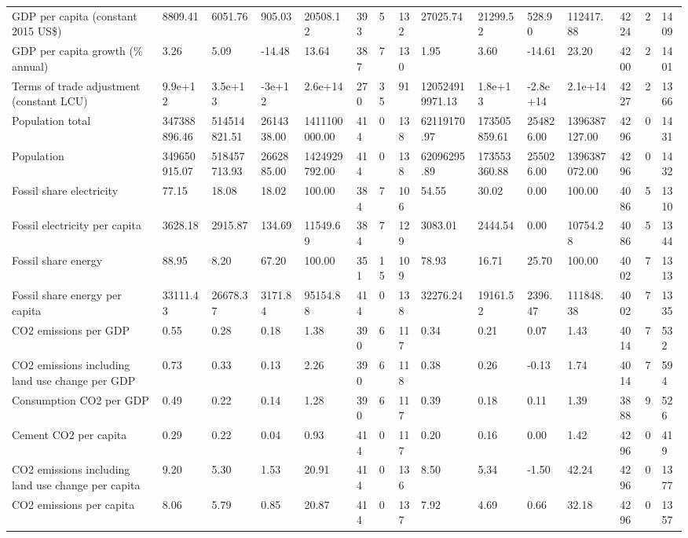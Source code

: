 \begin{longtable}{lllllllllllllll}
GDP per capita (constant 2015 US\$) & 8809.41 & 6051.76 & 905.03 & 20508.12 & 393 & 5 & 132 & 27025.74 & 21299.52 & 528.90 & 112417.88 & 4224 & 2 & 1409\\
GDP per capita growth (\% annual) & 3.26 & 5.09 & -14.48 & 13.64 & 387 & 7 & 130 & 1.95 & 3.60 & -14.61 & 23.20 & 4200 & 2 & 1401\\
\addlinespace
Terms of trade adjustment (constant LCU) & 9.9e+12 & 3.5e+13 & -3e+12 & 2.6e+14 & 270 & 35 & 91 & 120524919971.13 & 1.8e+13 & -2.8e+14 & 2.1e+14 & 4227 & 2 & 1366\\
Population total & 347388896.46 & 514514821.51 & 2614338.00 & 1411100000.00 & 414 & 0 & 138 & 62119170.97 & 173505859.61 & 254826.00 & 1396387127.00 & 4296 & 0 & 1431\\
Population & 349650915.07 & 518457713.93 & 2662885.00 & 1424929792.00 & 414 & 0 & 138 & 62096295.89 & 173553360.88 & 255026.00 & 1396387072.00 & 4296 & 0 & 1432\\
Fossil share electricity & 77.15 & 18.08 & 18.02 & 100.00 & 384 & 7 & 106 & 54.55 & 30.02 & 0.00 & 100.00 & 4086 & 5 & 1310\\
Fossil electricity per capita & 3628.18 & 2915.87 & 134.69 & 11549.69 & 384 & 7 & 129 & 3083.01 & 2444.54 & 0.00 & 10754.28 & 4086 & 5 & 1344\\
\addlinespace
Fossil share energy & 88.95 & 8.20 & 67.20 & 100.00 & 351 & 15 & 109 & 78.93 & 16.71 & 25.70 & 100.00 & 4002 & 7 & 1313\\
Fossil share energy per capita & 33111.43 & 26678.37 & 3171.84 & 95154.88 & 414 & 0 & 138 & 32276.24 & 19161.52 & 2396.47 & 111848.38 & 4002 & 7 & 1335\\
CO2 emissions per GDP & 0.55 & 0.28 & 0.18 & 1.38 & 390 & 6 & 117 & 0.34 & 0.21 & 0.07 & 1.43 & 4014 & 7 & 532\\
CO2 emissions including land use change per GDP & 0.73 & 0.33 & 0.13 & 2.26 & 390 & 6 & 118 & 0.38 & 0.26 & -0.13 & 1.74 & 4014 & 7 & 594\\
Consumption CO2 per GDP & 0.49 & 0.22 & 0.14 & 1.28 & 390 & 6 & 117 & 0.39 & 0.18 & 0.11 & 1.39 & 3888 & 9 & 526\\
\addlinespace
Cement CO2 per capita & 0.29 & 0.22 & 0.04 & 0.93 & 414 & 0 & 117 & 0.20 & 0.16 & 0.00 & 1.42 & 4296 & 0 & 419\\
CO2 emissions including land use change per capita & 9.20 & 5.30 & 1.53 & 20.91 & 414 & 0 & 136 & 8.50 & 5.34 & -1.50 & 42.24 & 4296 & 0 & 1377\\
CO2 emissions per capita & 8.06 & 5.79 & 0.85 & 20.87 & 414 & 0 & 137 & 7.92 & 4.69 & 0.66 & 32.18 & 4296 & 0 & 1357\\

\end{longtable}
